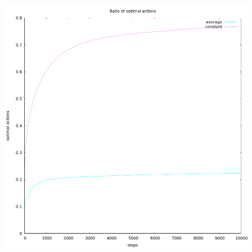 \documentclass[12pt,a4paper]{article}
\begin{document}
\begin{enumerate}
  \includegraphics[scale=0.3]{optimal}
\end{enumerate}
\end{document}
